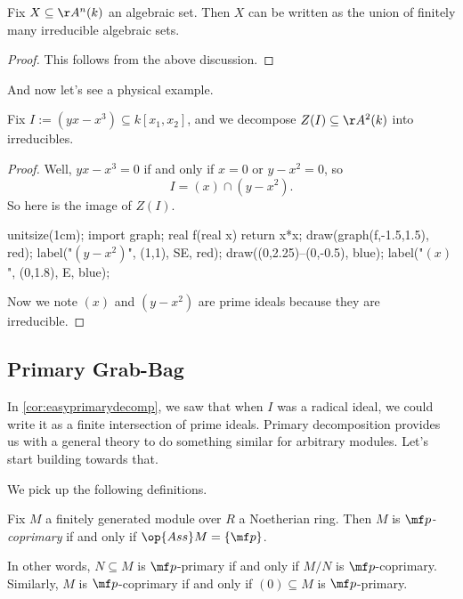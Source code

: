 \documentclass[../notes.tex]{subfiles}
\begin{document}
\begin{corollary}
	Fix $X\subseteq\AA^n(k)$ an algebraic set. Then $X$ can be written as the union of finitely many irreducible algebraic sets.
\end{corollary}
\begin{proof}
	This follows from the above discussion.
\end{proof}
And now let's see a physical example.
\begin{exe}
	Fix $I:=\left(yx-x^3\right)\subseteq k[x_1,x_2]$, and we decompose $Z(I)\subseteq\AA^2(k)$ into irreducibles.
\end{exe}
\begin{proof}
	Well, $yx-x^3=0$ if and only if $x=0$ or $y-x^2=0$, so
	\[I=(x)\cap\left(y-x^2\right).\]
	So here is the image of $Z(I)$.
	\begin{center}
		\begin{asy}
			unitsize(1cm);
			import graph;
			real f(real x)
			{
				return x*x;
			}
			draw(graph(f,-1.5,1.5), red);
			label("$\left(y-x^2\right)$", (1,1), SE, red);
			draw((0,2.25)--(0,-0.5), blue);
			label("$(x)$", (0,1.8), E, blue);
		\end{asy}
	\end{center}
	Now we note $(x)$ and $\left(y-x^2\right)$ are prime ideals because they are irreducible.
\end{proof}

\subsection{Primary Grab-Bag}
In \autoref{cor:easyprimarydecomp}, we saw that when $I$ was a radical ideal, we could write it as a finite intersection of prime ideals. Primary decomposition provides us with a general theory to do something similar for arbitrary modules. Let's start building towards that.

We pick up the following definitions.
\primarydefi*
\begin{definition}[Coprimary]
	Fix $M$ a finitely generated module over $R$ a Noetherian ring. Then $M$ is \textit{$\mf p$-coprimary} if and only if $\op{Ass}M=\{\mf p\}$.
\end{definition}
In other words, $N\subseteq M$ is $\mf p$-primary if and only if $M/N$ is $\mf p$-coprimary. Similarly, $M$ is $\mf p$-coprimary if and only if $(0)\subseteq M$ is $\mf p$-primary.
\end{document}
